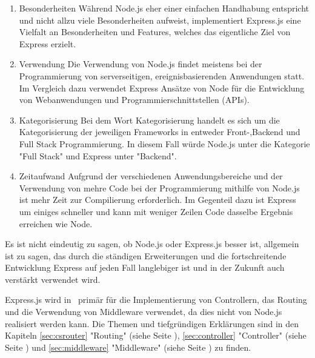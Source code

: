 \begin{enumerate}
    \item Besonderheiten
    \newline
    Während Node.js eher einer einfachen Handhabung entspricht und nicht allzu viele Besonderheiten aufweist, implementiert Express.js eine Vielfalt an Besonderheiten und Features, welches das eigentliche Ziel von Express erzielt.\cite{NodeExp}
    \item Verwendung
    \newline
    Die Verwendung von Node.js findet meistens bei der Programmierung von serverseitigen, ereignisbasierenden Anwendungen statt. Im Vergleich dazu verwendet Express Ansätze von Node für die Entwicklung von Webanwendungen und Programmierschnittstellen (APIs). \cite{NodeExp}
    \item Kategorisierung
    \newline
    Bei dem Wort Kategorisierung handelt es sich um die Kategorisierung der jeweiligen Frameworks in entweder Front-,Backend und Full Stack Programmierung. In diesem Fall würde Node.js unter die Kategorie "Full Stack" und Express unter "Backend".\cite{NodeExp}
    \item Zeitaufwand
    \newline
    Aufgrund der verschiedenen Anwendungsbereiche und der Verwendung von mehre Code bei der Programmierung mithilfe von Node.js ist mehr Zeit zur Compilierung erforderlich. Im Gegenteil dazu ist Express um einiges schneller und kann mit weniger Zeilen Code dasselbe Ergebnis erreichen wie Node.\cite{NodeExp}
\end{enumerate} 

Es ist nicht eindeutig zu sagen, ob Node.js oder Express.js besser ist, allgemein ist zu sagen, das durch die ständigen Erweiterungen und die fortschreitende Entwicklung Express auf jeden Fall langlebiger ist und in der Zukunft auch verstärkt verwendet wird. \cite{NodeExp}

Express.js wird in \ZELIA\ primär für die Implementierung von Controllern, das Routing und die Verwendung von Middleware verwendet, da dies nicht von Node.js realisiert werden kann. Die Themen und tiefgründigen Erklärungen sind in den Kapiteln \ref{sec:csrouter} "Routing" (siehe Seite \pageref{sec:csrouter}), \ref{sec:controller} "Controller" (siehe Seite \pageref{sec:controller}) und \ref{sec:middleware} "Middleware" (siehe Seite \pageref{sec:middleware}) zu finden. \cite{NodeExp}
